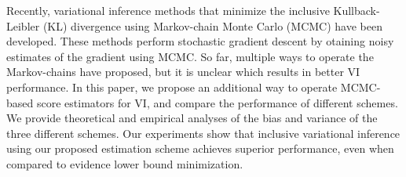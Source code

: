 
Recently, variational inference methods that minimize the inclusive Kullback-Leibler (KL) divergence using Markov-chain Monte Carlo (MCMC) have been developed.
These methods perform stochastic gradient descent by otaining noisy estimates of the gradient using MCMC.
So far, multiple ways to operate the Markov-chains have proposed, but it is unclear which results in better VI performance.
In this paper, we propose an additional way to operate MCMC-based score estimators for VI, and compare the performance of different schemes.
We provide theoretical and empirical analyses of the bias and variance of the three different schemes.
Our experiments show that inclusive variational inference using our proposed estimation scheme achieves superior performance, even when compared to evidence lower bound minimization.

